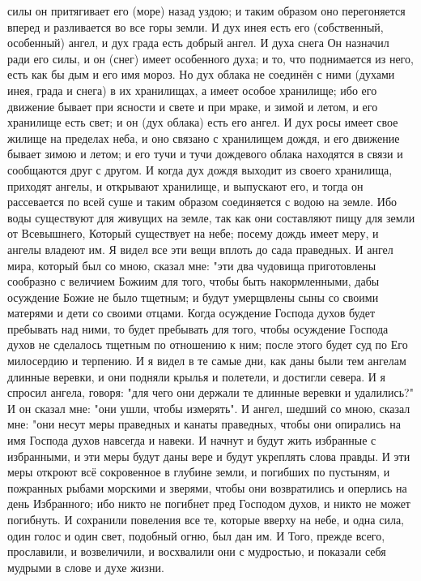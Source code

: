 силы он притягивает его (море) назад уздою; и таким образом оно перегоняется
вперед и разливается во все горы земли.
И дух инея есть его (собственный, особенный) ангел, и дух града есть
добрый ангел.
И духа снега Он назначил ради его силы, и он (снег) имеет особенного
духа; и то, что поднимается из него, есть как бы дым и его имя мороз.
Но дух облака не соединён с ними (духами инея, града и снега) в их
хранилищах, а имеет особое хранилище; ибо его движение бывает при ясности и
свете и при мраке, и зимой и летом, и его хранилище есть свет; и он (дух
облака) есть его ангел.
И дух росы имеет свое жилище на пределах неба, и оно связано с
хранилищем дождя, и его движение бывает зимою и летом; и его тучи и тучи
дождевого облака находятся в связи и сообщаются друг с другом.
И когда дух дождя выходит из своего хранилища, приходят ангелы, и
открывают хранилище, и выпускают его, и тогда он рассевается по всей суше и
таким образом соединяется с водою на земле.
Ибо воды существуют для живущих на земле, так как они составляют пищу
для земли от Всевышнего, Который существует на небе; посему дождь имеет меру,
и ангелы владеют им.
Я видел все эти вещи вплоть до сада праведных.
И ангел мира, который был со мною, сказал мне: "эти два чудовища
приготовлены сообразно с величием Божиим для того, чтобы быть накормленными,
дабы осуждение Божие не было тщетным; и будут умерщвлены сыны со своими
матерями и дети со своими отцами.
Когда осуждение Господа духов будет пребывать над ними, то будет
пребывать для того, чтобы осуждение Господа духов не сделалось тщетным по
отношению к ним; после этого будет суд по Его милосердию и терпению.
И я видел в те самые дни, как даны были тем ангелам длинные
веревки, и они подняли крылья и полетели, и достигли севера.
И я спросил ангела, говоря: "для чего они держали те длинные веревки и
удалились?"
И он сказал мне: "они ушли, чтобы измерять".
И ангел, шедший со мною, сказал мне: "они несут меры праведных и
канаты праведных, чтобы они опирались на имя Господа духов навсегда и навеки.
И начнут и будут жить избранные с избранными, и эти меры будут даны
вере и будут укреплять слова правды.
И эти меры откроют всё сокровенное в глубине земли, и погибших по
пустыням, и пожранных рыбами морскими и зверями, чтобы они возвратились и
оперлись на день Избранного; ибо никто не погибнет пред Господом духов, и никто
не может погибнуть.
И сохранили повеления все те, которые вверху на небе, и одна сила,
один голос и один свет, подобный огню, был дан им.
И Того, прежде всего, прославили, и возвеличили, и восхвалили они с
мудростью, и показали себя мудрыми в слове и духе жизни.
